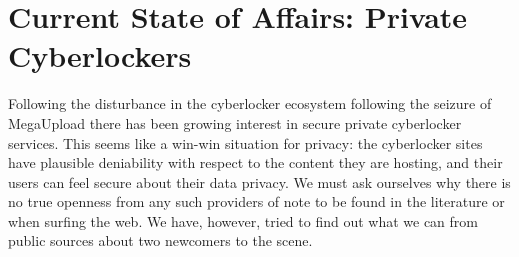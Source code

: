 \documentclass[12pt]{article}
\begin{document}



\section{Current State of Affairs: Private Cyberlockers}
\label{sec:technical_analysis}





%
Following the disturbance in the cyberlocker ecosystem following the seizure of MegaUpload there has been growing interest in secure private cyberlocker services.
This seems like a win-win situation for privacy: the cyberlocker sites have plausible deniability with respect to the content they are hosting, and their users can feel secure about their data privacy.
We must ask ourselves why there is no true openness from any such providers of note to be found in the literature or when surfing the web. \cite{borgmann2012security}
We have, however, tried to find out what we can from public sources about two newcomers to the scene.
\end{document}
